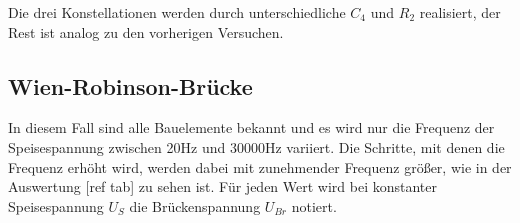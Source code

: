 Die drei Konstellationen werden durch unterschiedliche $C_4$ und $R_2$ realisiert, der Rest ist 
analog zu den vorherigen Versuchen.

\subsection{Wien-Robinson-Brücke}

In diesem Fall sind alle Bauelemente bekannt und es wird nur die Frequenz der Speisespannung
zwischen 20\si{\hertz} und 30000\si{\hertz} variiert. Die Schritte, mit denen die Frequenz erhöht
wird, werden dabei mit zunehmender Frequenz größer, wie in der Auswertung [ref tab] zu sehen ist.
Für jeden Wert wird bei konstanter Speisespannung $U_S$ die Brückenspannung $U_{Br}$ notiert.


